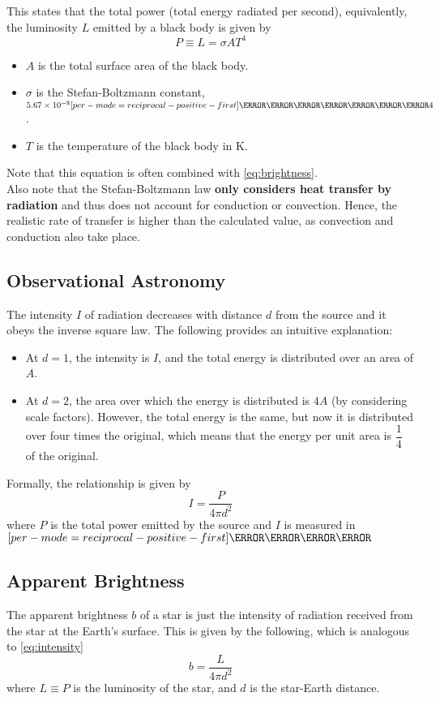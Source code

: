 \documentclass[a4paper,12pt]{article}
\let\oldsi\si
\renewcommand{\si}[1]{\oldsi[per-mode=reciprocal-positive-first]{#1}}
\newcommand{\lb}{\\[8pt]}
\begin{document}
This states that the total power (total energy radiated per second), equivalently, the luminosity $L$ emitted by a black body is given by
$$P \equiv L = \sigma A T^4$$
\begin{itemize}
  \item $A$ is the total surface area of the black body.
  \item $\sigma$ is the Stefan-Boltzmann constant, $5.67 \times 10^{-8} \si{\W\per\m\squared\per\kelvin\tothe{4}}$.
  \item $T$ is the temperature of the black body in K.
\end{itemize}

Note that this equation is often combined with \cref{eq:brightness}.\lb
Also note that the Stefan-Boltzmann law \textbf{only considers heat transfer by radiation} and thus does not account for conduction or convection. Hence, the realistic rate of transfer is higher than the calculated value, as convection and conduction also take place.

\pagebreak

\subsection{Observational Astronomy}

\begin{figure}[H]
  \centering
  
\end{figure}

The intensity $I$ of radiation decreases with distance $d$ from the source and it obeys the inverse square law. The following provides an intuitive explanation:
\begin{itemize}
  \item At $d = 1$, the intensity is $I$, and the total energy is distributed over an area of $A$.
  \item At $d = 2$, the area over which the energy is distributed is $4A$ (by considering scale factors). However, the total energy is the same, but now it is distributed over four times the original, which means that the energy per unit area is $\dfrac{1}{4}$ of the original.
\end{itemize}

Formally, the relationship is given by
\begin{equation}\label{eq:intensity}
  I = \frac{P}{4\pi d^2}
\end{equation}
where $P$ is the total power emitted by the source and $I$ is measured in $\si{\W\per\m\squared}$


\subsection{Apparent Brightness}

The apparent brightness $b$ of a star is just the intensity of radiation received from the star at the Earth's surface. This is given by the following, which is analogous to \cref{eq:intensity}
\begin{equation}\label{eq:brightness}
  b = \frac{L}{4\pi d^2}
\end{equation}
where $L \equiv P$ is the luminosity of the star, and $d$ is the star-Earth distance.
\end{document}
